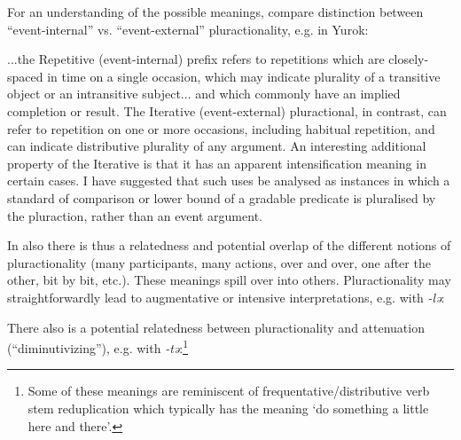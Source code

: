 \documentclass[output=paper]{langsci/langscibook}
\begin{document}
For an understanding of the possible meanings, compare  distinction between “event-internal” vs. “event-external” pluractionality, e.g. in Yu\-rok:
\begin{modquote}
  ...the Repetitive (event-internal) prefix refers to repetitions which are closely-spaced in time on a single occasion, which may indicate plurality of a transitive object or an intransitive subject... and which commonly have an implied completion or result. The Iterative (event-external) pluractional, in contrast, can refer to repetition on one or more occasions, including habitual repetition, and can indicate distributive plurality of any argument. An interesting additional property of the Iterative is that it has an apparent intensification meaning in certain cases. I have suggested that such uses be analysed as instances in which a standard of comparison or lower bound of a gradable predicate is pluralised by the pluraction, rather than an event argument. \citep[255]{Wood2007}  
\end{modquote}


In  also there is thus a relatedness and potential overlap of the different notions of pluractionality (many participants, many actions, over and over, one after the other, bit by bit, etc.). These meanings spill over into others. Pluractionality may straightforwardly lead to augmentative or intensive interpretations, e.g. with \textit{-lə}: 
 
\ea%
    \label{ex:proto:15}
  \ea 
 \ex 
 \ex  
 \ex  
 \ex  
  \z	
\z

There also is a potential relatedness between pluractionality and attenuation (“diminutivizing”), e.g. with \textit{-tə}:\footnote{Some of these meanings are reminiscent of  frequentative/distributive verb stem reduplication which typically has the meaning ‘do something a little here and there’.}
 
\ea%
    \label{ex:proto:16}
  \ea 
 \ex 
 \ex 
 \ex 
 \ex 
 \ex 
 \ex 
  \ex 
  \z
\z
\end{document}
